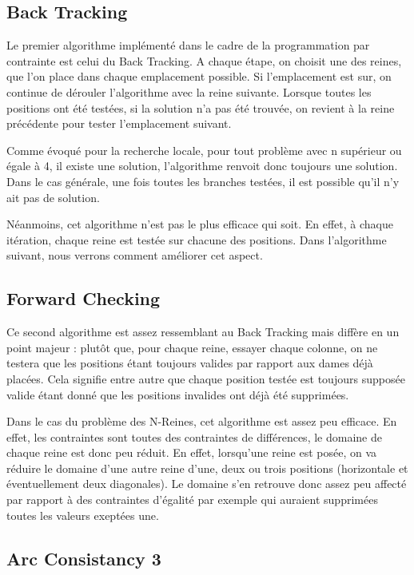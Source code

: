 \documentclass[a4paper,10pt]{article}
\begin{document}
\subsection{Back Tracking}

Le premier algorithme implémenté dans le cadre de la programmation par contrainte est celui du Back Tracking. A chaque étape, on choisit une des reines, que l'on place dans chaque emplacement possible. Si l'emplacement est sur, on continue de dérouler l'algorithme avec la reine suivante. Lorsque toutes les positions ont été testées, si la solution n'a pas été trouvée, on revient à la reine précédente pour tester l'emplacement suivant.

Comme évoqué pour la recherche locale, pour tout problème avec n supérieur ou égale à 4, il existe une solution, l'algorithme renvoit donc toujours une solution. Dans le cas générale, une fois toutes les branches testées, il est possible qu'il n'y ait pas de solution.

Néanmoins, cet algorithme n'est pas le plus efficace qui soit. En effet, à chaque itération, chaque reine est testée sur chacune des positions. Dans l'algorithme suivant, nous verrons comment améliorer cet aspect.

\subsection{Forward Checking}

Ce second algorithme est assez ressemblant au Back Tracking mais diffère en un point majeur : plutôt que, pour chaque reine, essayer chaque colonne, on ne testera que les positions étant toujours valides par rapport aux dames déjà placées. Cela signifie entre autre que chaque position testée est toujours supposée valide étant donné que les positions invalides ont déjà été supprimées.

Dans le cas du problème des N-Reines, cet algorithme est assez peu efficace. En effet, les contraintes sont toutes des contraintes de différences, le domaine de chaque reine est donc peu réduit. En effet, lorsqu'une reine est posée, on va réduire le domaine d'une autre reine d'une, deux ou trois positions (horizontale et éventuellement deux diagonales). Le domaine s'en retrouve donc assez peu affecté par rapport à des contraintes d'égalité par exemple qui auraient supprimées toutes les valeurs exeptées une.

\subsection{Arc Consistancy 3}
\end{document}
